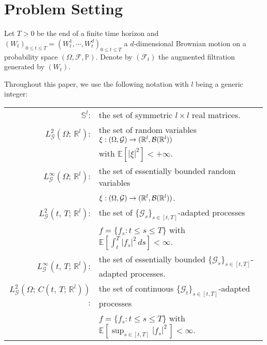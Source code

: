 \documentclass[final]{siamltex}
\begin{document}
\section{Problem Setting}\label{problemsetting}

Let $T>0$ be the end of a finite time horizon and $(W_t)_{0 \le t \le T}=(W_t^1,\cdots,W_t^d)_{0 \le t \le T}$
a $d$-dimensional Brownian motion on a probability
space $(\Omega, {{\mathcal F}}, {\mathbb{P}})$. Denote by $({{\mathcal F}}_t)$ the
augmented filtration generated by $(W_t)$.

Throughout this paper, we use the following notation with $l$ being a generic integer:
\begin{table}[http]
\begin{tabular}{rl}
 $\mathbb S^l$:& the set of symmetric $l \times l$ real matrices.\\
  $L^2_{{\mathcal G}}(\Omega; \, {\mathbb{R}}^l)$:& the set of random variables $\xi: (\Omega, {{\mathcal G}}) \rightarrow ({\mathbb{R}}^l, {\cal B}({\mathbb{R}}^l))$ \\ &with ${\mathbb{E}\left[{|\xi|^2}\right]}<+\infty$.\\
 $L^\infty_{{\mathcal G}}(\Omega; \, {\mathbb{R}}^l)$:& the set of essentially bounded  random variables \\  &$\xi: (\Omega, {{\mathcal G}}) \rightarrow ({\mathbb{R}}^l, {\cal B}({\mathbb{R}}^l))$.\\
 $L^2_{{\mathcal G}}(t, \, T; \, {\mathbb{R}}^l)$: &the set of $\{{{\mathcal G}}_s\}_{s\in [t,T]}$-adapted processes \\ &$f=\{f_s: t\leq s\leq T\}$ with ${\mathbb{E}\left[{ \int_t^T|f_s|^2\, ds}\right]} < \infty$.\\
 $L^\infty_{{\mathcal G}}(t, \, T; \, {\mathbb{R}}^l)$:&the set of essentially  bounded $\{{{\mathcal G}}_s\}_{s\in [t,T]}$-adapted processes.\\
 $L^2_{{\mathcal G}}(\Omega; \, C(t, \, T; \, {\mathbb{R}}^l))$:& the set of continuous 
         $\{{{\mathcal G}}_t\}_{s\in [t,T]}$-adapted processes \\&$f=\{f_s: t\leq s\leq T\}$ with ${\mathbb{E}\left[{ \sup_{s\in [t,T]}|f_s|^2\, }\right]} < \infty$.\\
\end{tabular}
\end{table}
\end{document}
